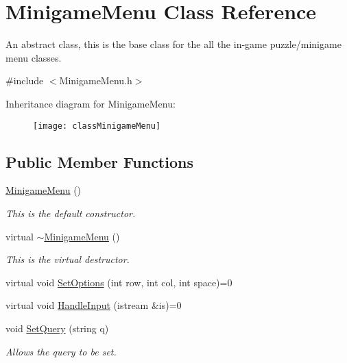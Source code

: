 \hypertarget{classMinigameMenu}{\section{Minigame\-Menu Class Reference}
\label{classMinigameMenu}
}


An abstract class, this is the base class for the all the in-\/game puzzle/minigame menu classes.  




{\ttfamily \#include $<$Minigame\-Menu.\-h$>$}

Inheritance diagram for Minigame\-Menu\-:\begin{figure}[H]
\begin{center}
\leavevmode
\texttt{[image: classMinigameMenu]}
\end{center}
\end{figure}
\subsection*{Public Member Functions}
\begin{DoxyCompactItemize}
\item 
\hyperlink{classMinigameMenu_a90d42578d68f68c3b26c414f90f2d950}{Minigame\-Menu} ()
\begin{DoxyCompactList}\small\item\em This is the default constructor. \end{DoxyCompactList}\item 
virtual \hyperlink{classMinigameMenu_a6b8621ca44319d6b2759766bdca9cbf9}{$\sim$\-Minigame\-Menu} ()
\begin{DoxyCompactList}\small\item\em This is the virtual destructor. \end{DoxyCompactList}\item 
virtual void \hyperlink{classMinigameMenu_abde3ae319bf1660a8626c6f765e054a8}{Set\-Options} (int row, int col, int space)=0
\item 
virtual void \hyperlink{classMinigameMenu_a3f854c4eefb0f3110cd085b3cfe56460}{Handle\-Input} (istream \&is)=0
\item 
void \hyperlink{classMinigameMenu_a875e8a60a910f28e245c998772d043e4}{Set\-Query} (string q)
\begin{DoxyCompactList}\small\item\em Allows the query to be set. \end{DoxyCompactList}\end{DoxyCompactItemize}
